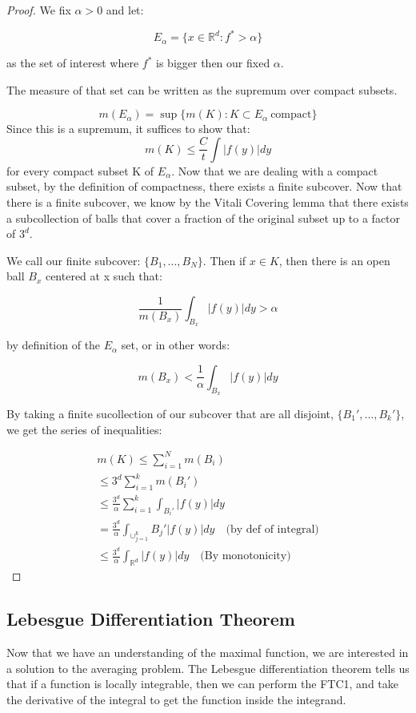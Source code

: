 \documentclass[class=article, crop=false]{standalone}
\begin{document}
			\begin{proof}
				We fix $\alpha > 0$ and let:

					$$E_\alpha = \{x \in \mathbb{R}^d : f^* > \alpha\}$$

				as the set of interest where $f^*$ is bigger then our fixed $\alpha$. 

				The measure of that set can be written as the supremum over compact subsets.

					$$m(E_\alpha) = \sup \{m(K) : K \subset E_\alpha \ \text{compact}\}$$
				Since this is a supremum, it suffices to show that:
					$$m(K) \le \frac{C}{t} \int |f(y)| dy$$
				for every compact subset K of $E_\alpha$. Now that we are dealing with a compact subset, by the definition of compactness, there exists a finite subcover. Now that there is a finite subcover, we know by the Vitali Covering lemma that there exists a subcollection of balls that cover a fraction of the original subset up to a factor of $3^d$.

				We call our finite subcover: $\{B_1, ..., B_N\}$. Then if $x \in K$, then there is an open ball $B_x$ centered at x such that:

					$$\frac{1}{m(B_x)} \int_{B_x} |f(y)|dy > \alpha$$

				by definition of the $E_\alpha$ set, or in other words:

					$$m(B_x) < \frac{1}{\alpha} \int_{B_x} |f(y)| dy$$

				By taking a finite sucollection of our subcover that are all disjoint, $\{B_1', ..., B_k'\}$, we get the series of inequalities:

				\begin{align}
					m(K) \le \sum_{i=1}^N m(B_i) \\
						\le 3^d \sum_{i=1}^k m(B_i') \\
						\le \frac{3^d}{\alpha} \sum_{i=1}^k \int_{B_i'} |f(y)| dy \\
						= \frac{3^d}{\alpha}  \int_{\cup_{j=1}^k} B_j' |f(y)| dy \quad \text{(by def of integral)} \\
						\le \frac{3^d}{\alpha} \int_{\mathbb{R}^d} |f(y)| dy \quad \text{(By monotonicity)}
				\end{align}
			\end{proof}
		\subsection{Lebesgue Differentiation Theorem}
			Now that we have an understanding of the maximal function, we are interested in a solution to the averaging problem. The Lebesgue differentiation theorem tells us that if a function is locally integrable, then we can perform the FTC1, and take the derivative of the integral to get the function inside the integrand.
\end{document}
